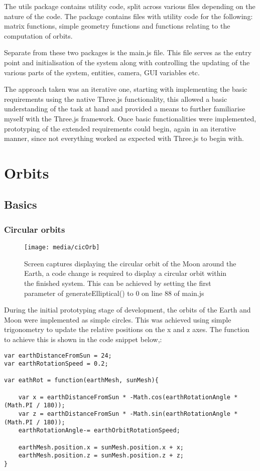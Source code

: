\documentclass[titlepage]{article}
\begin{document}
The utils package contains utility code, split across various files depending on the nature of the code. The package contains files with utility code for the following: matrix functions, simple geometry functions and functions relating to the computation of orbits.


Separate from these two packages is the main.js file. This file serves as the entry point and initialisation of the system along with controlling the updating of the various parts of the system, entities, camera, GUI variables etc. 


The approach taken was an iterative one, starting with implementing the basic requirements using the native Three.js functionality, this allowed a basic understanding of the task at hand and provided a means to further familiarise myself with the Three.js framework. Once basic functionalities were implemented, prototyping of the extended requirements could begin, again in an iterative manner, since not everything worked as expected with Three.js to begin with.


\section{Orbits}

\subsection{Basics}
\subsubsection{Circular orbits}
\begin{figure}[h!]
                \centering
                \texttt{[image: media/cicOrb]}
                \caption{Screen captures displaying the circular orbit of the Moon around the Earth, a code change is required to display a circular orbit within the finished system. This can be achieved by setting the first parameter of generateElliptical() to 0 on line 88 of main.js }
            \end{figure}
During the initial prototyping stage of development, the orbits of the Earth and Moon were implemented as simple circles. This was achieved using simple trigonometry to update the relative positions on the x and z axes. The function to achieve this is shown in the code snippet below,:

\begin{lstlisting}[caption=Simple orbit calculation]
var earthDistanceFromSun = 24;
var earthRotationSpeed = 0.2;

var eathRot = function(earthMesh, sunMesh){
    
    var x = earthDistanceFromSun * -Math.cos(earthRotationAngle * (Math.PI / 180));
    var z = earthDistanceFromSun * -Math.sin(earthRotationAngle * (Math.PI / 180));
    earthRotationAngle-= earthOrbitRotationSpeed;
    
    earthMesh.position.x = sunMesh.position.x + x;
    earthMesh.position.z = sunMesh.position.z + z;
}

\end{lstlisting}
\end{document}
